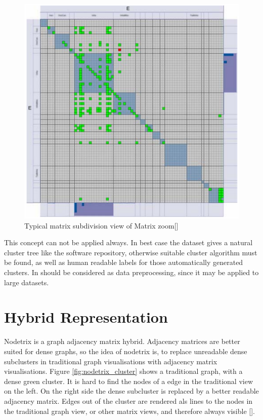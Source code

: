 \begin{figure}[h]
\centering
\includegraphics[width=\textwidth/2]{images/matrixzoom_cluster}
\caption{Typical matrix subdivision view of Matrix zoom[\cite{ham_phd}] \label{fig:matrixzoom_cluster}}
\end{figure}

This concept can not be applied always. In best case the dataset gives a natural cluster tree like the software repository, otherwise suitable cluster algorithm must be found, as well as human readable labels for those automatically generated clusters. In should be considered as data preprocessing, since it may be applied to large datasets.













\section{Hybrid Representation}
Nodetrix is a graph adjacency matrix hybrid. Adjacency matrices are better suited for dense graphs, so the idea of nodetrix is, to replace unreadable dense subclusters in traditional graph visualisations with adjacency matrix visualisations. Figure \ref{fig:nodetrix_cluster} shows a traditional graph, with a dense green cluster. It is hard to find the nodes of a edge in the traditional view on the left. On the right side the dense subcluster is replaced by a better readable  adjacency matrix. Edges out of the cluster are rendered als lines to the nodes in the traditional graph view, or other matrix views, and therefore always visible [\cite{henry-nodetrix-2007}].



